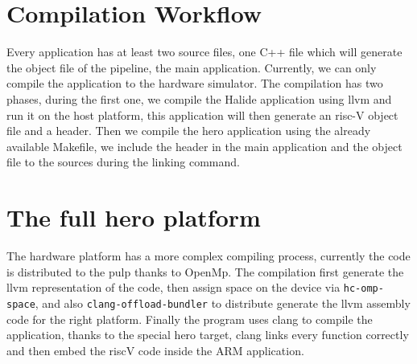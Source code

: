 \section{Compilation Workflow}
	Every application has at least two source files, one C++ file which will generate the object file of the pipeline, the main application. 
	Currently, we can only compile the application to the hardware simulator.
	The compilation has two phases, during the first one, we compile the Halide application using llvm and run it on the host platform, this application will then generate an risc-V object file and a header.
	Then we compile the hero application using the already available Makefile, we include the header in the main application and the object file to the sources during the linking command.

		
\section{The full hero platform}
	The hardware platform has a more complex compiling process, currently the code is distributed to the \gls{pulp} thanks to OpenMp. The compilation first generate the llvm representation of the  code, then assign space on the device via \verb|hc-omp-space|, and also \verb|clang-offload-bundler| to distribute generate the llvm assembly code for the right platform. Finally the  program uses clang to compile the application, thanks to the special hero target, clang links every function correctly and then embed the riscV code inside the ARM application.

